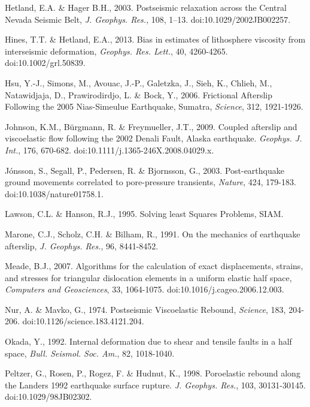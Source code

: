 \documentclass[extra]{gji}
\begin{document}
\begin{thebibliography}{}
 Hetland, E.A. \& Hager B.H.,
  2003. Postseismic relaxation across the Central Nevada Seismic Belt,
  \textit{J. Geophys. Res.}, 108,
  1–13. doi:10.1029/2002JB002257.

 Hines, T.T. \&
  Hetland, E.A., 2013. Bias in estimates of lithosphere viscosity from
  interseismic deformation, \textit{Geophys. Res. Lett.}, 40,
  4260-4265. doi:10.1002/grl.50839.

 Hsu, Y.-J., Simons, M., Avouac,
  J.-P., Galetzka, J., Sieh, K., Chlieh, M., Natawidjaja, D.,
  Prawirodirdjo, L. \& Bock, Y., 2006. Frictional Afterslip Following
  the 2005 Nias-Simeulue Earthquake, Sumatra, \textit{Science}, 312,
  1921-1926.


Johnson, K.M.,
  B\"urgmann, R. \& Freymueller, J.T., 2009. Coupled afterslip and
  viscoelastic flow following the 2002 Denali Fault, Alaska
  earthquake. \textit{Geophys. J.  Int.}, 176,
  670-682. doi:10.1111/j.1365-246X.2008.04029.x.

 J\'onsson, S.,
  Segall, P., Pedersen, R. \& Bjornsson, G., 2003. Post-earthquake
  ground movements correlated to pore-pressure transients,
  \textit{Nature}, 424, 179-183. doi:10.1038/nature01758.1.

 Lawson, C.L. \&
  Hanson, R.J., 1995. Solving least Squares Problems, SIAM.

 Marone, C.J., Scholz,
  C.H.  \& Bilham, R., 1991. On the mechanics of earthquake
  afterslip, \textit{J. Geophys. Res.}, 96, 8441-8452.

 Meade, B.J., 2007. Algorithms for the
  calculation of exact displacements, strains, and stresses for
  triangular dislocation elements in a uniform elastic half space,
  \textit{Computers and Geosciences}, 33,
  1064-1075. doi:10.1016/j.cageo.2006.12.003.

 Nur, A. \& Mavko, G.,
  1974. Postseismic Viscoelastic Rebound, \textit{Science}, 183,
  204-206. doi:10.1126/science.183.4121.204.

 Okada, Y., 1992. Internal
  deformation due to shear and tensile faults in a half space,
  \textit{Bull. Seismol. Soc.  Am.}, 82, 1018-1040.

 Peltzer, G., Rosen, P.,
  Rogez, F. \& Hudnut, K., 1998. Poroelastic rebound along the Landers
  1992 earthquake surface rupture. \textit{J. Geophys. Res.}, 103,
  30131-30145. doi:10.1029/98JB02302.


\end{thebibliography}
\end{document}
